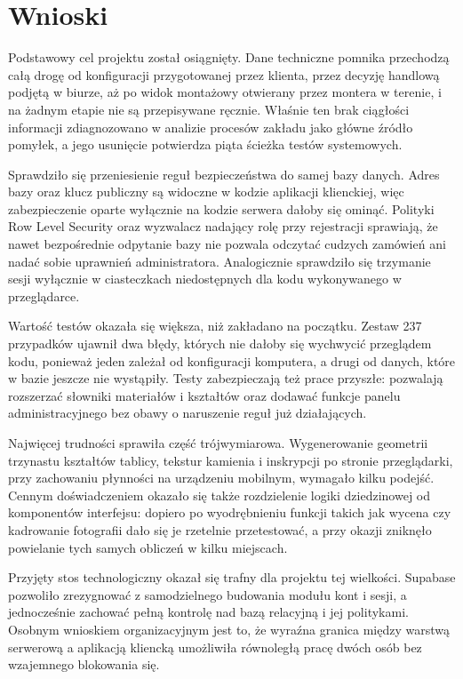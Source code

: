 \section{Wnioski}
\label{sec:wnioski}

Podstawowy cel projektu został osiągnięty. Dane techniczne pomnika przechodzą całą drogę od konfiguracji przygotowanej przez klienta, przez decyzję handlową podjętą w biurze, aż po widok montażowy otwierany przez montera w terenie, i na żadnym etapie nie są przepisywane ręcznie. Właśnie ten brak ciągłości informacji zdiagnozowano w analizie procesów zakładu jako główne źródło pomyłek, a jego usunięcie potwierdza piąta ścieżka testów systemowych.

Sprawdziło się przeniesienie reguł bezpieczeństwa do samej bazy danych. Adres bazy oraz klucz publiczny są widoczne w kodzie aplikacji klienckiej, więc zabezpieczenie oparte wyłącznie na kodzie serwera dałoby się ominąć. Polityki Row Level Security oraz wyzwalacz nadający rolę przy rejestracji sprawiają, że nawet bezpośrednie odpytanie bazy nie pozwala odczytać cudzych zamówień ani nadać sobie uprawnień administratora. Analogicznie sprawdziło się trzymanie sesji wyłącznie w ciasteczkach niedostępnych dla kodu wykonywanego w przeglądarce.

Wartość testów okazała się większa, niż zakładano na początku. Zestaw 237 przypadków ujawnił dwa błędy, których nie dałoby się wychwycić przeglądem kodu, ponieważ jeden zależał od konfiguracji komputera, a drugi od danych, które w bazie jeszcze nie wystąpiły. Testy zabezpieczają też prace przyszłe: pozwalają rozszerzać słowniki materiałów i kształtów oraz dodawać funkcje panelu administracyjnego bez obawy o naruszenie reguł już działających.

Najwięcej trudności sprawiła część trójwymiarowa. Wygenerowanie geometrii trzynastu kształtów tablicy, tekstur kamienia i inskrypcji po stronie przeglądarki, przy zachowaniu płynności na urządzeniu mobilnym, wymagało kilku podejść. Cennym doświadczeniem okazało się także rozdzielenie logiki dziedzinowej od komponentów interfejsu: dopiero po wyodrębnieniu funkcji takich jak wycena czy kadrowanie fotografii dało się je rzetelnie przetestować, a przy okazji zniknęło powielanie tych samych obliczeń w kilku miejscach.

Przyjęty stos technologiczny okazał się trafny dla projektu tej wielkości. Supabase pozwoliło zrezygnować z samodzielnego budowania modułu kont i sesji, a jednocześnie zachować pełną kontrolę nad bazą relacyjną i jej politykami. Osobnym wnioskiem organizacyjnym jest to, że wyraźna granica między warstwą serwerową a aplikacją kliencką umożliwiła równoległą pracę dwóch osób bez wzajemnego blokowania się.
